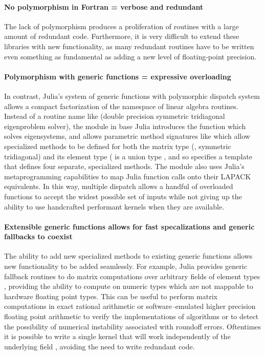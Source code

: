 \documentclass[pldi]{sigplanconf-pldi15}
\begin{document}
\paragraph{No polymorphism in Fortran = verbose and redundant}
The lack of polymorphism produces a proliferation of routines with a large
amount of redundant code. Furthermore, it is very difficult to extend these
libraries with new functionality, as many redundant routines have to be written
even something as fundamental as adding a new level of floating-point
precision. 


\paragraph{Polymorphism with generic functions = expressive overloading}
In contrast, Julia's system of generic functions with polymorphic dispatch
system allows a compact factorization of the namespace of linear algebra
routines.  Instead of a routine name like  (double precision
symmetric tridiagonal eigenproblem solver), the  module in base
Julia introduces the function  which solves eigensystems, and allows
parametric method signatures like
 which allow specialized
methods to be defined for both the matrix type (,
symmetric tridiagonal) and its element type ( is a union type
, and so
 specifies a template that defines four separate,
specialized methods.  The  module also uses Julia's
metaprogramming capabilities to map Julia function calls onto their LAPACK
equivalents.  In this way, multiple dispatch allows a handful of overloaded
functions to accept the widest possible set of inputs while not giving up the
ability to use handcrafted performant kernels when they are available.

\paragraph{Extensible generic functions allows for fast specalizations and generic fallbacks to coexist}
The ability to add new specialized methods to existing generic functions allows
new functionality to be added seamlessly. For example, Julia provides generic
fallback routines to do matrix computations over arbitrary fields of element
types , providing the ability to compute on numeric types which are not
mappable to hardware floating point types. This can be useful to perform matrix
computations in exact rational arithmetic or software--emulated higher
precision floating point arithmetic to verify the implementations of algorithms
or to detect the possibility of numerical instability associated with roundoff
errors. Oftentimes it is possible to write a single kernel that will work
independently of the underlying field , avoiding the need to write
redundant code.
\end{document}
